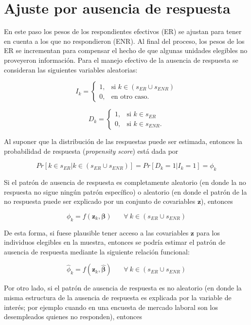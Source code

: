 \documentclass[
  12pt,
]{book}
\begin{document}
\hypertarget{ajuste-por-ausencia-de-respuesta}{%
\section{Ajuste por ausencia de respuesta}\label{ajuste-por-ausencia-de-respuesta}}

En este paso los pesos de los respondientes efectivos (ER) se ajustan para tener en cuenta a los que no respondieron (ENR). Al final del proceso, los pesos de los ER se incrementan para compensar el hecho de que algunas unidades elegibles no proveyeron información. Para el manejo efectivo de la ausencia de respuesta se consideran las siguientes variables aleatorias:

\[
I_k=
\begin{cases}
1,  &\text{si $k \in (s_{ER} \cup s_{ENR})$}\\
0,  &\text{en otro caso.}
\end{cases}
\]

\[
D_k=
\begin{cases}
1,  &\text{si $k \in s_{ER}$}\\
0,  &\text{si $k \in s_{ENR}$.}
\end{cases}
\]

Al suponer que la distribución de las respuestas puede ser estimada, entonces la probabilidad de respuesta (\emph{propensity score}) está dada por

\[
Pr[ k\in s_{ER}|k\in (s_{ER} \cup s_{ENR})]=Pr[D_k = 1|I_k = 1]=\phi_k
\]

Si el patrón de ausencia de respuesta es completamente aleatorio (en donde la no respuesta no sigue ningún patrón específico) o aleatorio (en donde el patrón de la no respuesta puede ser explicado por un conjunto de covariables \(\mathbf{z}\)), entonces

\[
\phi_k = f(\mathbf{z}_k, \boldsymbol{\beta})   \ \ \ \ \ \ \ \ \forall \ k \in (s_{ER} \cup s_{ENR})
\]

De esta forma, si fuese plausible tener acceso a las covariables \(\mathbf{z}\) para los individuos elegibles en la muestra, entonces se podría estimar el patrón de ausencia de respuesta mediante la siguiente relación funcional:

\[
\hat{\phi}_k = f(\mathbf{z}_k, \hat{\boldsymbol{\beta}})   \ \ \ \ \ \ \ \ \forall \ k \in (s_{ER} \cup s_{ENR})
\]

Por otro lado, si el patrón de ausencia de respuesta es no aleatorio (en donde la misma estructura de la ausencia de respuesta es explicada por la variable de interés; por ejemplo cuando en una encuesta de mercado laboral son los desempleados quienes no responden), entonces
\end{document}
